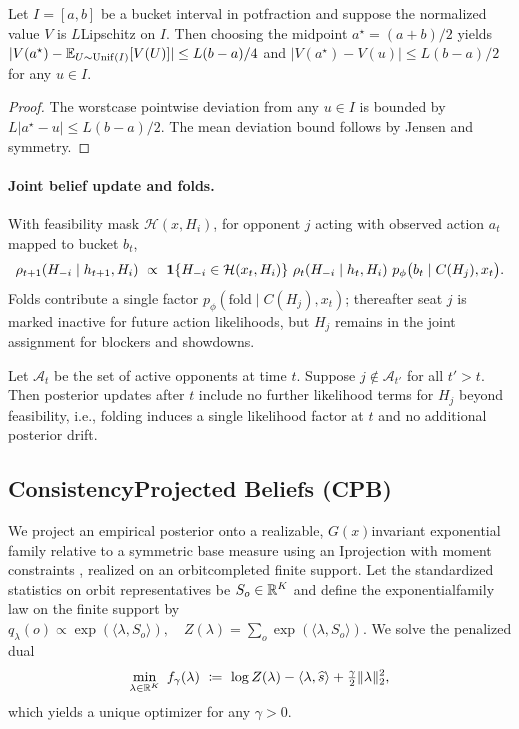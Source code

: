 \begin{lemma}
Let $I=[a,b]$ be a bucket interval in pot\textendash fraction and suppose the normalized value $V$ is $L$\textendash Lipschitz on $I$. Then choosing the midpoint $a^\star=(a+b)/2$ yields $|V(a^\star)-\mathbb{E}_{U\sim\mathrm{Unif}(I)}[V(U)]|\le L(b-a)/4$ and $|V(a^\star)-V(u)|\le L(b-a)/2$ for any $u\in I$.
\end{lemma}
\begin{proof}
The worst\textendash case pointwise deviation from any $u\in I$ is bounded by $L|a^\star-u|\le L(b-a)/2$. The mean deviation bound follows by Jensen and symmetry.
\end{proof}

\paragraph{Joint belief update and folds.}
With feasibility mask $\mathcal{H}(x,H_i)$, for opponent $j$ acting with observed action $a_t$ mapped to bucket $b_t$,
\[
\rho_{t+1}(H_{-i}\mid h_{t+1},H_i)\ \propto\ \1\{H_{-i}\in\mathcal{H}(x_t,H_i)\}\ \rho_t(H_{-i}\mid h_t,H_i)\ p_\phi\big(b_t\mid C(H_j),x_t\big).
\]
Folds contribute a single factor $p_\phi(\mathrm{fold}\mid C(H_j),x_t)$; thereafter seat $j$ is marked inactive for future action likelihoods, but $H_j$ remains in the joint assignment for blockers and showdowns.

\begin{proposition}
Let $\mathcal{A}_t$ be the set of active opponents at time $t$. Suppose $j\notin\mathcal{A}_{t'}$ for all $t'>t$. Then posterior updates after $t$ include no further likelihood terms for $H_j$ beyond feasibility, i.e., folding induces a single likelihood factor at $t$ and no additional posterior drift.
\end{proposition}

\subsection{Consistency\textendash Projected Beliefs (CPB)}
We project an empirical posterior onto a realizable, $G(x)$\textendash invariant exponential family relative to a symmetric base measure using an I\textendash projection with moment constraints \cite{csiszar1975i}, realized on an orbit\textendash completed finite support. Let the standardized statistics on orbit representatives be $S_o\in\mathbb{R}^K$ and define the exponential\textendash family law on the finite support by
$
q_\lambda(o) \propto \exp(\langle \lambda, S_o\rangle),\quad Z(\lambda)=\sum_{o}\exp(\langle \lambda, S_o\rangle).
$
We solve the penalized dual
\[
\min_{\lambda\in\R^K}\ f_\gamma(\lambda)\ \coloneqq\ \log Z(\lambda) - \langle \lambda,\widehat s\rangle + \tfrac{\gamma}{2}\|\lambda\|_2^2,
\]
which yields a unique optimizer for any $\gamma>0$.


